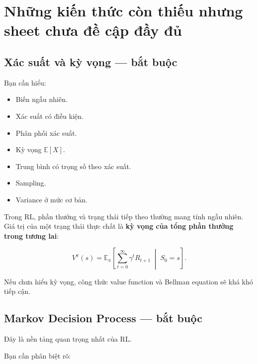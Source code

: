 \documentclass[12pt,a4paper]{article}
\begin{document}
\section{Những kiến thức còn thiếu nhưng sheet chưa đề cập đầy đủ}

\subsection{Xác suất và kỳ vọng --- bắt buộc}

Bạn cần hiểu:

\begin{itemize}[leftmargin=1.5em]
    \item Biến ngẫu nhiên.
    \item Xác suất có điều kiện.
    \item Phân phối xác suất.
    \item Kỳ vọng $\mathbb{E}[X]$.
    \item Trung bình có trọng số theo xác suất.
    \item Sampling.
    \item Variance ở mức cơ bản.
\end{itemize}

Trong RL, phần thưởng và trạng thái tiếp theo thường mang tính ngẫu nhiên. Giá trị của một trạng thái thực chất là \textbf{kỳ vọng của tổng phần thưởng trong tương lai}:

\begin{equation}
V^\pi(s)
=
\mathbb{E}_{\pi}
\left[
\sum_{t=0}^{\infty}
\gamma^t R_{t+1}
\;\middle|\;
S_0=s
\right].
\end{equation}

Nếu chưa hiểu kỳ vọng, công thức value function và Bellman equation sẽ khá khó tiếp cận.

\subsection{Markov Decision Process --- bắt buộc}

Đây là nền tảng quan trọng nhất của RL.

Bạn cần phân biệt rõ:
\end{document}
